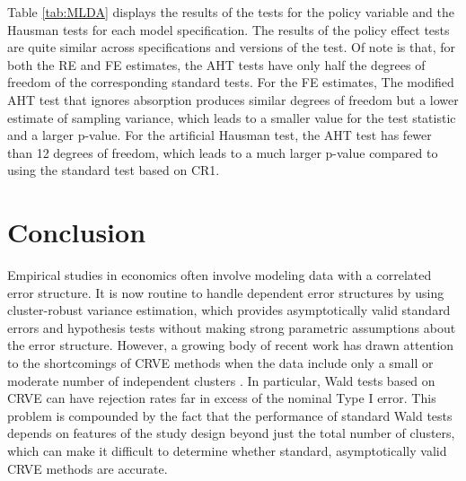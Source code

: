 \documentclass[12pt]{article}\usepackage[]{graphicx}\usepackage[]{color}
\begin{document}
Table \ref{tab:MLDA} displays the results of the tests for the policy variable and the Hausman tests for each model specification. 
The results of the policy effect tests are quite similar across specifications and versions of the test. 
Of note is that, for both the RE and FE estimates, the AHT tests have only half the degrees of freedom of the corresponding standard tests. 
For the FE estimates, The modified AHT test that ignores absorption produces similar degrees of freedom but a lower estimate of sampling variance, which leads to a smaller value for the test statistic and a larger p-value.
For the artificial Hausman test, the AHT test has fewer than 12 degrees of freedom, which leads to a much larger p-value compared to using the standard test based on CR1. 

\section{Conclusion}
\label{sec:conclusion}

Empirical studies in economics often involve modeling data with a correlated error structure. 
It is now routine to handle dependent error structures by using cluster-robust variance estimation, which provides asymptotically valid standard errors and hypothesis tests without making strong parametric assumptions about the error structure. 
However, a growing body of recent work has drawn attention to the shortcomings of CRVE methods when the data include only a small or moderate number of independent clusters \citep{Cameron2008bootstrap, Cameron2015practitioners, Imbens2015robust, MacKinnon2016wild}. 
In particular, Wald tests based on CRVE can have rejection rates far in excess of the nominal Type I error. 
This problem is compounded by the fact that the performance of standard Wald tests depends on features of the study design beyond just the total number of clusters, which can make it difficult to determine whether standard, asymptotically valid CRVE methods are accurate. 
\end{document}

